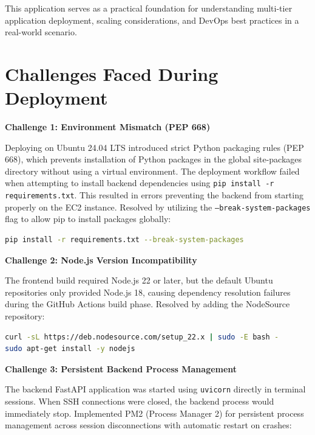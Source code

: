\documentclass{article}
\begin{document}
This application serves as a practical foundation for understanding multi-tier application deployment, scaling considerations, and DevOps best practices in a real-world scenario.

\newpage

\section{Challenges Faced During Deployment}

\textbf{Challenge 1: Environment Mismatch (PEP 668)}

Deploying on Ubuntu 24.04 LTS introduced strict Python packaging rules (PEP 668), which prevents installation of Python packages in the global site-packages directory without using a virtual environment. The deployment workflow failed when attempting to install backend dependencies using \texttt{pip install -r requirements.txt}. This resulted in errors preventing the backend from starting properly on the EC2 instance. Resolved by utilizing the \texttt{--break-system-packages} flag to allow pip to install packages globally:

\begin{lstlisting}[language=bash, caption=Fixed dependency installation]
pip install -r requirements.txt --break-system-packages
\end{lstlisting}

\vspace{0.3cm}

\textbf{Challenge 2: Node.js Version Incompatibility}

The frontend build required Node.js 22 or later, but the default Ubuntu repositories only provided Node.js 18, causing dependency resolution failures during the GitHub Actions build phase. Resolved by adding the NodeSource repository:

\begin{lstlisting}[language=bash, caption=Setup Node.js 22]
curl -sL https://deb.nodesource.com/setup_22.x | sudo -E bash -
sudo apt-get install -y nodejs
\end{lstlisting}

\vspace{0.3cm}

\textbf{Challenge 3: Persistent Backend Process Management}

The backend FastAPI application was started using \texttt{uvicorn} directly in terminal sessions. When SSH connections were closed, the backend process would immediately stop. Implemented PM2 (Process Manager 2) for persistent process management across session disconnections with automatic restart on crashes:
\end{document}
